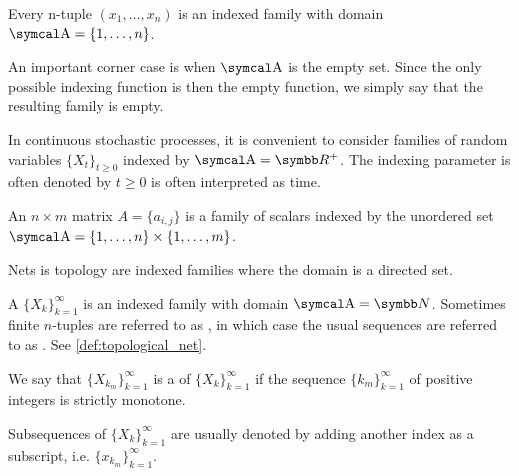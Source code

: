 \begin{example}\label{ex:indexed_families}
  \mbox{}
  \begin{defenum}
    \item Every n-tuple \( (x_1, \ldots, x_n) \) is an indexed family with domain \( \CA = \{ 1, \ldots, n \} \).

    \item An important corner case is when \( \CA \) is the empty set. Since the only possible indexing function is then the empty function, we simply say that the resulting family is empty.

    \item In continuous stochastic processes, it is convenient to consider families of random variables \( \{ X_t \}_{t \geq 0} \) indexed by \( \CA = \BR^+ \). The indexing parameter is often denoted by \( t \geq 0 \) is often interpreted as time.

    \item An \( n \times m \) matrix \( A = \{ a_{i,j} \} \) is a family of scalars indexed by the unordered set \( \CA = \{ 1, \ldots, n \} \times \{ 1, \ldots, m \} \).

    \item Nets is topology are indexed families where the domain is a directed set.
  \end{defenum}
\end{example}

\begin{definition}\label{def:sequence}
  A  \( \{ X_k \}_{k=1}^\infty \) is an indexed family with domain \( \CA = \BN \). Sometimes finite \( n \)-tuples are referred to as , in which case the usual sequences are referred to as . See \cref{def:topological_net}.

  We say that \( \{ X_{k_m} \}_{k=1}^\infty \) is a  of \( \{ X_k \}_{k=1}^\infty \) if the sequence \( \{ k_m \}_{k=1}^\infty \) of positive integers is strictly monotone.

  Subsequences of \( \{ X_k \}_{k=1}^\infty \) are usually denoted by adding another index as a subscript, i.e. \( \{ x_{k_m} \}_{k=1}^\infty \).
\end{definition}

